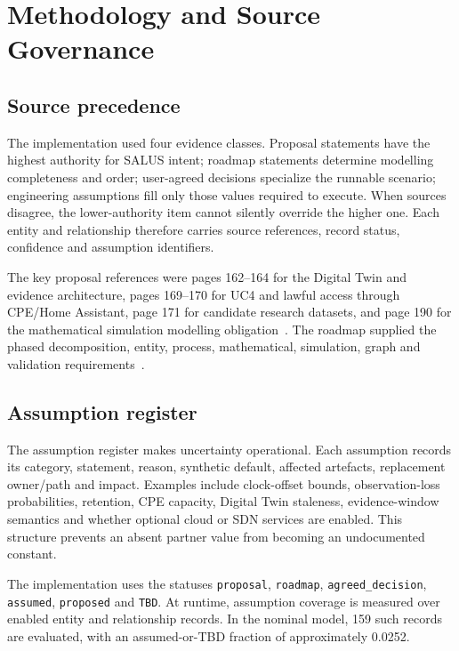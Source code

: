 ﻿\documentclass[11pt,a4paper]{article}
\newcommand{\code}[1]{\texttt{#1}}
\begin{document}
\section{Methodology and Source Governance}

\subsection{Source precedence}

The implementation used four evidence classes. Proposal statements have the highest authority for SALUS intent; roadmap statements determine modelling completeness and order; user-agreed decisions specialize the runnable scenario; engineering assumptions fill only those values required to execute. When sources disagree, the lower-authority item cannot silently override the higher one. Each entity and relationship therefore carries source references, record status, confidence and assumption identifiers.

The key proposal references were pages 162--164 for the Digital Twin and evidence architecture, pages 169--170 for UC4 and lawful access through CPE/Home Assistant, page 171 for candidate research datasets, and page 190 for the mathematical simulation modelling obligation~\cite{proposal}. The roadmap supplied the phased decomposition, entity, process, mathematical, simulation, graph and validation requirements~\cite{roadmap}.

\subsection{Assumption register}

The assumption register makes uncertainty operational. Each assumption records its category, statement, reason, synthetic default, affected artefacts, replacement owner/path and impact. Examples include clock-offset bounds, observation-loss probabilities, retention, CPE capacity, Digital Twin staleness, evidence-window semantics and whether optional cloud or SDN services are enabled. This structure prevents an absent partner value from becoming an undocumented constant.

The implementation uses the statuses \code{proposal}, \code{roadmap}, \code{agreed\_decision}, \code{assumed}, \code{proposed} and \code{TBD}. At runtime, assumption coverage is measured over enabled entity and relationship records. In the nominal model, 159 such records are evaluated, with an assumed-or-TBD fraction of approximately 0.0252.
\end{document}
